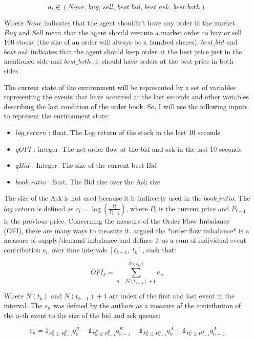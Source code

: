\documentclass[a4paper]{article}
\begin{document}
$$a_t \in \left (None,\, buy,\, sell,\, best\_bid,\, best\_ask,\, best\_both \right)$$

Where $None$ indicates that the agent shouldn't have any order in the market. $Buy$ and $Sell$ mean that the agent should execute a market order to buy or sell $100$ stocks (the size of an order will always be a hundred shares). $best\_bid$ and $best\_ask$ indicates that the agent should keep order at the best price just in the mentioned side and $best\_both$, it should have orders at the best price in both sides.

The current state of the environment will be represented by a set of variables representing the events that have occurred at the last seconds and other variables describing the last condition of the order book. So, I will use the following inputs to represent the environment state:

\begin{itemize}
\item $log\_return$ : float. The Log return of the stock in the last 10 seconds
\item $qOFI$ : integer. The net order flow at the bid and ask in the last 10 seconds
\item $qBid$ : Integer. The size of the current best Bid
\item $book\_ratio$ : float. The Bid size over the Ask size
\end{itemize}

The size of the Ask is not used because it is indirectly used in the $book\_ratio$. The $log\_return$ is defined as $r_t = \log \left(  \frac{P_t}{P_{t-1}}\right)$, where $P_t$ is the current price and $P_{t-1}$ is the previous price. Concerning the measure of the Order Flow Imbalance (OFI), there are many ways to measure it. \cite{cont2014price} argued the *order flow imbalance* is a measure of supply/demand imbalance and defines it as a sum of individual event contribution $e_n$ over time intervals $\left[ t_{k-1}, \; t_k \right]$, such that:

$$OFI_k = \sum^{N(t_k)}_{n=N(t_{k-1})+1} e_n$$

Where $N(t_k)$ and $N(t_{k-1}) + 1$ are index of the first and last event in the interval. The $e_n$ was defined by the authors as a measure of the contribution of the $n$-th event to the size of the bid and ask queues:

$$e_n = \mathbb{1}_{P_{n}^{B} \geq P_{n-1}^{B}} q^{B}_{n} - \mathbb{1}_{P_{n}^{B} \leq P_{n-1}^{B}}  q^{B}_{n-1} - \mathbb{1}_{P_{n}^{A} \leq P_{n-1}^{A}} q^{A}_{n} + \mathbb{1}_{P_{n}^{A} \geq P_{n-1}^{A}}  q^{A}_{n-1}$$
\end{document}

